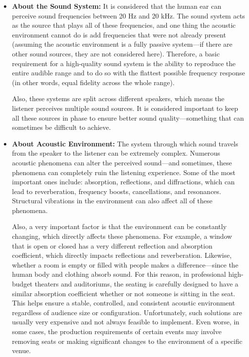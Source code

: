\begin{itemize}
	\item \textbf{About the Sound System:} It is considered that the human ear can perceive sound frequencies between 20 Hz and 20 kHz. The sound system acts as the source that plays all of these frequencies, and one thing the acoustic environment cannot do is add frequencies that were not already present (assuming the acoustic environment is a fully passive system—if there are other sound sources, they are not considered here). Therefore, a basic requirement for a high-quality sound system is the ability to reproduce the entire audible range and to do so with the flattest possible frequency response (in other words, equal fidelity across the whole range).
	
	Also, these systems are split across different speakers, which means the listener perceives multiple sound sources. It is considered important to keep all these sources in phase to ensure better sound quality—something that can sometimes be difficult to achieve.
	
	\item \textbf{About Acoustic Environment:} The system through which sound travels from the speaker to the listener can be extremely complex. Numerous acoustic phenomena can alter the perceived sound—and sometimes, these phenomena can completely ruin the listening experience. Some of the most important ones include: absorption, reflections, and diffractions, which can lead to reverberation, frequency boosts, cancellations, and resonances. Structural vibrations in the environment can also affect all of these phenomena.
	
	Also, a very important factor is that the environment can be constantly changing, which directly affects these phenomena. For example, a window that is open or closed has a very different reflection and absorption coefficient, which directly impacts reflections and reverberation. Likewise, whether a room is empty or filled with people makes a difference—since the human body and clothing absorb sound. For this reason, in professional high-budget theaters and auditoriums, the seating is carefully designed to have a similar absorption coefficient whether or not someone is sitting in the seat. This helps ensure a stable, controlled, and consistent acoustic environment regardless of audience size or configuration. Unfortunately, such solutions are usually very expensive and not always feasible to implement. Even worse, in some cases, the production requirements of certain events may involve removing seats or making significant changes to the environment of a specific venue.
\end{itemize}

